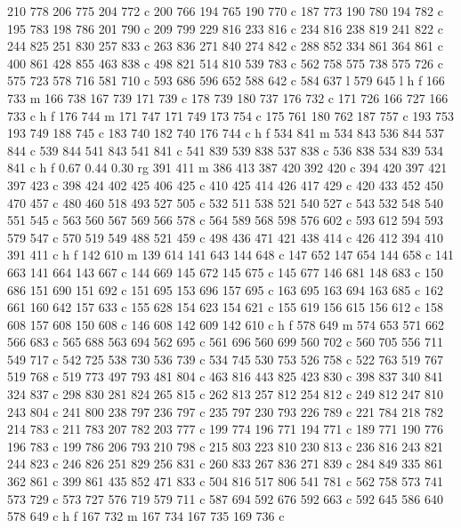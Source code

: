 {{   210 778 206 775 204 772 c
   200 766 194 765 190 770 c
   187 773 190 780 194 782 c
   195 783 198 786 201 790 c
   209 799 229 816 233 816 c
   234 816 238 819 241 822 c
   244 825 251 830 257 833 c
   263 836 271 840 274 842 c
   288 852 334 861 364 861 c
   400 861 428 855 463 838 c
   498 821 514 810 539 783 c
   562 758 575 738 575 726 c
   575 723 578 716 581 710 c
   593 686 596 652 588 642 c
   584 637 l
   579 645 l
   h f
   166 733 m
   166 738 167 739 171 739 c
   178 739 180 737 176 732 c
   171 726 166 727 166 733 c
   h f
   176 744 m
   171 747 171 749 173 754 c
   175 761 180 762 187 757 c
   193 753 193 749 188 745 c
   183 740 182 740 176 744 c
   h f
   534 841 m
   534 843 536 844 537 844 c
   539 844 541 843 541 841 c
   541 839 539 838 537 838 c
   536 838 534 839 534 841 c
   h f
   0.67 0.44 0.30 rg
   391 411 m
   386 413 387 420 392 420 c
   394 420 397 421 397 423 c
   398 424 402 425 406 425 c
   410 425 414 426 417 429 c
   420 433 452 450 470 457 c
   480 460 518 493 527 505 c
   532 511 538 521 540 527 c
   543 532 548 540 551 545 c
   563 560 567 569 566 578 c
   564 589 568 598 576 602 c
   593 612 594 593 579 547 c
   570 519 549 488 521 459 c
   498 436 471 421 438 414 c
   426 412 394 410 391 411 c
   h f
   142 610 m
   139 614 141 643 144 648 c
   147 652 147 654 144 658 c
   141 663 141 664 143 667 c
   144 669 145 672 145 675 c
   145 677 146 681 148 683 c
   150 686 151 690 151 692 c
   151 695 153 696 157 695 c
   163 695 163 694 163 685 c
   162 661 160 642 157 633 c
   155 628 154 623 154 621 c
   155 619 156 615 156 612 c
   158 608 157 608 150 608 c
   146 608 142 609 142 610 c
   h f
   578 649 m
   574 653 571 662 566 683 c
   565 688 563 694 562 695 c
   561 696 560 699 560 702 c
   560 705 556 711 549 717 c
   542 725 538 730 536 739 c
   534 745 530 753 526 758 c
   522 763 519 767 519 768 c
   519 773 497 793 481 804 c
   463 816 443 825 423 830 c
   398 837 340 841 324 837 c
   298 830 281 824 265 815 c
   262 813 257 812 254 812 c
   249 812 247 810 243 804 c
   241 800 238 797 236 797 c
   235 797 230 793 226 789 c
   221 784 218 782 214 783 c
   211 783 207 782 203 777 c
   199 774 196 771 194 771 c
   189 771 190 776 196 783 c
   199 786 206 793 210 798 c
   215 803 223 810 230 813 c
   236 816 243 821 244 823 c
   246 826 251 829 256 831 c
   260 833 267 836 271 839 c
   284 849 335 861 362 861 c
   399 861 435 852 471 833 c
   504 816 517 806 541 781 c
   562 758 573 741 573 729 c
   573 727 576 719 579 711 c
   587 694 592 676 592 663 c
   592 645 586 640 578 649 c
   h f
   167 732 m
   167 734 167 735 169 736 c
}}
